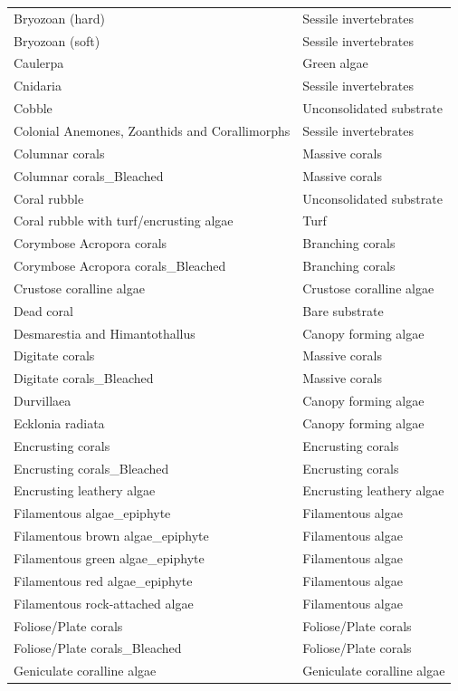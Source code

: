 \begin{longtable}[]{@{}
  >{\raggedright\arraybackslash}p{}
  >{\raggedright\arraybackslash}p{}@{}}
Bryozoan (hard) & Sessile invertebrates \\
Bryozoan (soft) & Sessile invertebrates \\
Caulerpa & Green algae \\
Cnidaria & Sessile invertebrates \\
Cobble & Unconsolidated substrate \\
Colonial Anemones, Zoanthids and Corallimorphs & Sessile
invertebrates \\
Columnar corals & Massive corals \\
Columnar corals\_Bleached & Massive corals \\
Coral rubble & Unconsolidated substrate \\
Coral rubble with turf/encrusting algae & Turf \\
Corymbose Acropora corals & Branching corals \\
Corymbose Acropora corals\_Bleached & Branching corals \\
Crustose coralline algae & Crustose coralline algae \\
Dead coral & Bare substrate \\
Desmarestia and Himantothallus & Canopy forming algae \\
Digitate corals & Massive corals \\
Digitate corals\_Bleached & Massive corals \\
Durvillaea & Canopy forming algae \\
Ecklonia radiata & Canopy forming algae \\
Encrusting corals & Encrusting corals \\
Encrusting corals\_Bleached & Encrusting corals \\
Encrusting leathery algae & Encrusting leathery algae \\
Filamentous algae\_epiphyte & Filamentous algae \\
Filamentous brown algae\_epiphyte & Filamentous algae \\
Filamentous green algae\_epiphyte & Filamentous algae \\
Filamentous red algae\_epiphyte & Filamentous algae \\
Filamentous rock-attached algae & Filamentous algae \\
Foliose/Plate corals & Foliose/Plate corals \\
Foliose/Plate corals\_Bleached & Foliose/Plate corals \\
Geniculate coralline algae & Geniculate coralline algae \\

\end{longtable}
